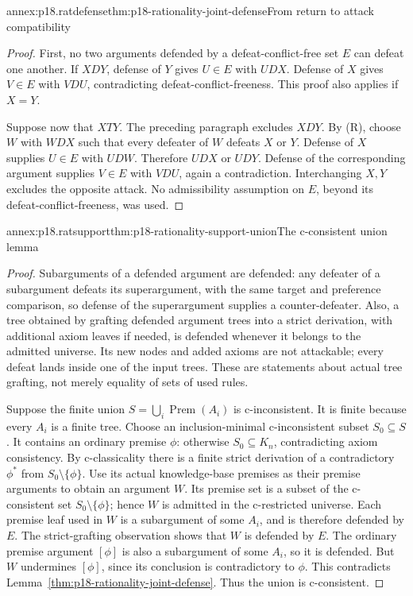 \begin{annexitem}{annex:p18.ratdefense}{thm:p18-rationality-joint-defense}{From return to attack compatibility}
\begin{proof}
First, no two arguments defended by a defeat-conflict-free set \(E\)
can defeat one another. If \(X D Y\), defense of \(Y\) gives
\(U\in E\) with \(U D X\). Defense of \(X\) gives \(V\in E\)
with \(V D U\), contradicting defeat-conflict-freeness.
This proof also applies if \(X=Y\).

Suppose now that \(X T Y\). The preceding paragraph excludes \(X D Y\).
By (R), choose \(W\) with \(W D X\) such that every defeater of \(W\)
defeats \(X\) or \(Y\). Defense of \(X\) supplies \(U\in E\)
with \(U D W\). Therefore \(U D X\) or \(U D Y\).
Defense of the corresponding argument supplies \(V\in E\) with
\(V D U\), again a contradiction. Interchanging \(X,Y\) excludes the
opposite attack. No admissibility assumption on \(E\), beyond its
defeat-conflict-freeness, was used.
\end{proof}
\end{annexitem}

\begin{annexitem}{annex:p18.ratsupport}{thm:p18-rationality-support-union}{The c-consistent union lemma}
\begin{proof}
Subarguments of a defended argument are defended: any defeater of a
subargument defeats its superargument, with the same target and preference
comparison, so defense of the superargument supplies a counter-defeater.
Also, a tree obtained by grafting defended argument trees into a strict
derivation, with additional axiom leaves if needed, is defended whenever
it belongs to the admitted universe. Its new nodes and added axioms
are not attackable; every defeat lands inside one of the input trees.
These are statements about actual tree grafting, not merely equality
of sets of used rules.

Suppose the finite union \(S=\bigcup_i\operatorname{Prem}(A_i)\) is
c-inconsistent. It is finite because every \(A_i\) is a finite tree.
Choose an inclusion-minimal c-inconsistent subset \(S_0\subseteq S\).
It contains an ordinary premise \(\phi\): otherwise
\(S_0\subseteq K_n\), contradicting axiom consistency.
By c-classicality there is a finite strict derivation of a contradictory
\(\phi^\ast\) from \(S_0\setminus\{\phi\}\).
Use its actual knowledge-base premises as their premise arguments to
obtain an argument \(W\). Its premise set is a subset of the
c-consistent set \(S_0\setminus\{\phi\}\); hence \(W\) is admitted
in the c-restricted universe.
Each premise leaf used in \(W\) is a subargument of some \(A_i\),
and is therefore defended by \(E\). The strict-grafting observation
shows that \(W\) is defended by \(E\).
The ordinary premise argument \([\phi]\) is also a subargument of
some \(A_i\), so it is defended.
But \(W\) undermines \([\phi]\), since its conclusion is contradictory
to \(\phi\). This contradicts
Lemma~\ref{thm:p18-rationality-joint-defense}.
Thus the union is c-consistent.
\end{proof}
\end{annexitem}

